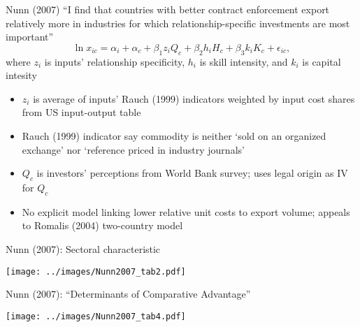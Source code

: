 \documentclass[10pt,notes=hide]{beamer}
\begin{document}
\begin{frame}{Nunn (2007)}
``I find that countries with better contract enforcement export relatively more in industries for which relationship-specific investments are most important''
\begin{equation*}
\ln x_{ic} = 
\alpha_i + \alpha_c 
+ \beta_1 z_i Q_c + \beta_2 h_i H_c + \beta_3 k_i K_c 
+ \epsilon_{ic},
\end{equation*}
where $z_i$ is inputs' relationship specificity, $h_i$ is skill intensity, and $k_i$ is capital intesity
\begin{itemize}
	\item $z_i$ is average of inputs' Rauch (1999) indicators weighted by input cost shares from US input-output table
	\item Rauch (1999) indicator say commodity is neither `sold on an organized exchange' nor `reference priced in industry journals'
	\item $Q_c$ is investors' perceptions from World Bank survey; uses legal origin as IV for $Q_c$
	\item No explicit model linking lower relative unit costs to export volume; appeals to Romalis (2004) two-country model
\end{itemize}
\end{frame}
\begin{frame}{Nunn (2007): Sectoral characteristic}
\begin{center}\texttt{[image: ../images/Nunn2007\_tab2.pdf]}\end{center}
\end{frame}
\begin{frame}{Nunn (2007): ``Determinants of Comparative Advantage''}
\begin{center}\texttt{[image: ../images/Nunn2007\_tab4.pdf]}\end{center}
\end{frame}
\end{document}
